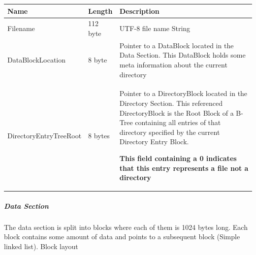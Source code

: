 \begin{tabular}{|l|l|p{5cm}|}
\hline
\textbf{Name} & \textbf{Length} & \textbf{Description}
\\  \hline

Filename & 112 byte & UTF-8 file name String


\\  \hline

DataBlockLocation & 8 byte & Pointer to a DataBlock located in the Data Section.
This DataBlock holds some meta information about the current directory


\\  \hline

DirectoryEntryTreeRoot & 8 bytes & Pointer to a DirectoryBlock located in the
Directory Section. This referenced DirectoryBlock is the Root Block of a B-Tree
containing all entries of that directory specified by the current Directory Entry Block.
\newline

\textbf{This field containing a 0 indicates that this entry represents a file not a directory}



\\  \hline

\end{tabular}


\subparagraph{Data Section}
The data section is split into blocks where each of them is 1024 bytes long.
Each block contains some amount of data and points to a subsequent block (Simple
linked list).\newline\newline
Block layout \\

